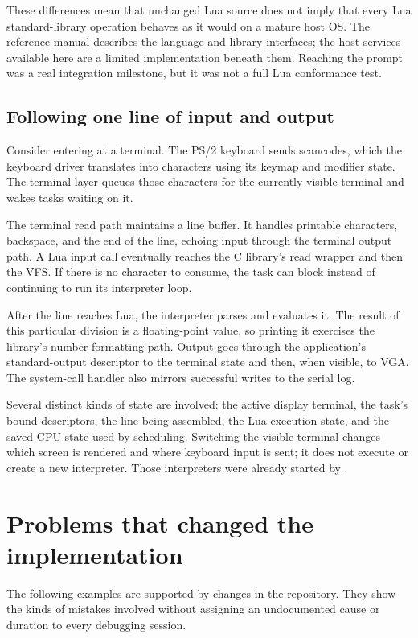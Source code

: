 \documentclass[11pt,a4paper]{scrartcl}
\newcommand{\code}[1]{\texttt{\detokenize{#1}}}
\begin{document}
These differences mean that unchanged Lua source does not imply that every
Lua standard-library operation behaves as it would on a mature host OS.
The reference manual describes the language and library interfaces; the
host services available here are a limited implementation beneath
them.\cite{lua-manual} Reaching the prompt was a real integration milestone,
but it was not a full Lua conformance test.


\subsection{Following one line of input and output}

Consider entering \code{print(3/4)} at a terminal. The PS/2 keyboard sends
scancodes, which the keyboard driver translates into characters using its
keymap and modifier state. The terminal layer queues those characters
for the currently visible terminal and wakes tasks waiting on it.

The terminal read path maintains a line buffer. It handles printable
characters, backspace, and the end of the line, echoing input through the
terminal output path. A Lua input call eventually reaches the C library's
read wrapper and then the VFS. If there is no character to consume, the
task can block instead of continuing to run its interpreter loop.

After the line reaches Lua, the interpreter parses and evaluates it. The
result of this particular division is a floating-point value, so printing
it exercises the library's number-formatting path. Output goes through
the application's standard-output descriptor to the terminal state and
then, when visible, to VGA. The system-call handler also mirrors successful
writes to the serial log.

Several distinct kinds of state are involved: the active display terminal,
the task's bound descriptors, the line being assembled, the Lua execution
state, and the saved CPU state used by scheduling. Switching the visible
terminal changes which screen is rendered and where keyboard input is
sent; it does not execute \code{exec} or create a new interpreter. Those
interpreters were already started by \code{init}.

\section{Problems that changed the implementation}
\label{sec:problems}

The following examples are supported by changes in the repository. They
show the kinds of mistakes involved without assigning an undocumented
cause or duration to every debugging session.
\end{document}
